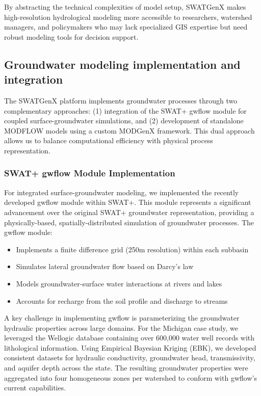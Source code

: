 \documentclass[final,3p,times]{elsarticle}
\begin{document}
By abstracting the technical complexities of model setup, SWATGenX makes high-resolution hydrological modeling more accessible to researchers, watershed managers, and policymakers who may lack specialized GIS expertise but need robust modeling tools for decision support.

\subsection{Groundwater modeling implementation and integration}
\label{subsec:groundwater}

The SWATGenX platform implements groundwater processes through two complementary approaches: (1) integration of the SWAT+ gwflow module for coupled surface-groundwater simulations, and (2) development of standalone MODFLOW models using a custom MODGenX framework. This dual approach allows us to balance computational efficiency with physical process representation.

\subsubsection{SWAT+ gwflow Module Implementation}
For integrated surface-groundwater modeling, we implemented the recently developed gwflow module within SWAT+. This module represents a significant advancement over the original SWAT+ groundwater representation, providing a physically-based, spatially-distributed simulation of groundwater processes. The gwflow module:

\begin{itemize}
    \item Implements a finite difference grid (250m resolution) within each subbasin
    \item Simulates lateral groundwater flow based on Darcy's law
    \item Models groundwater-surface water interactions at rivers and lakes
    \item Accounts for recharge from the soil profile and discharge to streams
\end{itemize}

A key challenge in implementing gwflow is parameterizing the groundwater hydraulic properties across large domains. For the Michigan case study, we leveraged the Wellogic database containing over 600,000 water well records with lithological information. Using Empirical Bayesian Kriging (EBK), we developed consistent datasets for hydraulic conductivity, groundwater head, transmissivity, and aquifer depth across the state. The resulting groundwater properties were aggregated into four homogeneous zones per watershed to conform with gwflow's current capabilities.
\end{document}
